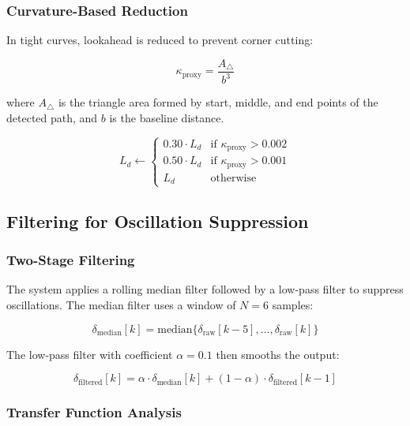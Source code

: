\documentclass[11pt,a4paper]{article}
\begin{document}
\subsubsection{Curvature-Based Reduction}

In tight curves, lookahead is reduced to prevent corner cutting:

\begin{equation}
\kappa_{\text{proxy}} = \frac{A_{\triangle}}{b^3}
\end{equation}

where $A_{\triangle}$ is the triangle area formed by start, middle, and end points of the detected path, and $b$ is the baseline distance.

\begin{equation}
L_d \leftarrow \begin{cases}
0.30 \cdot L_d & \text{if } \kappa_{\text{proxy}} > 0.002 \\
0.50 \cdot L_d & \text{if } \kappa_{\text{proxy}} > 0.001 \\
L_d & \text{otherwise}
\end{cases}
\end{equation}

\subsection{Filtering for Oscillation Suppression}

\subsubsection{Two-Stage Filtering}

The system applies a rolling median filter followed by a low-pass filter to suppress oscillations. The median filter uses a window of $N = 6$ samples:

\begin{equation}
\delta_{\text{median}}[k] = \text{median}\{\delta_{\text{raw}}[k-5], \ldots, \delta_{\text{raw}}[k]\}
\end{equation}

The low-pass filter with coefficient $\alpha = 0.1$ then smooths the output:

\begin{equation}
\delta_{\text{filtered}}[k] = \alpha \cdot \delta_{\text{median}}[k] + (1-\alpha) \cdot \delta_{\text{filtered}}[k-1]
\end{equation}

\subsubsection{Transfer Function Analysis}
\end{document}
